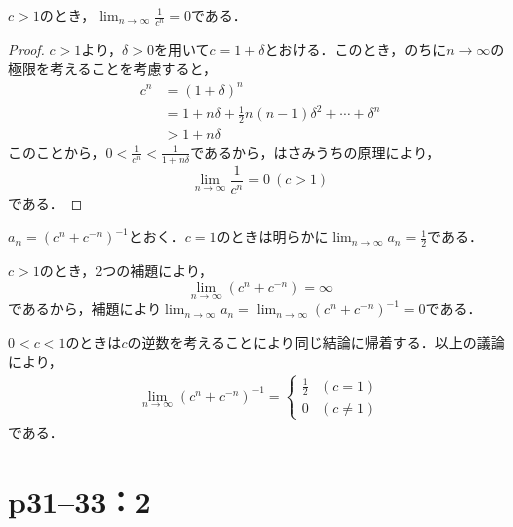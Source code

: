 \begin{lemma}{}{}



    $c>1$のとき，$\lim_{n \to \infty} \frac{1}{c^n} = 0$である．


\end{lemma}
\begin{proof}
    $c>1$より，$\delta >0$を用いて$c=1+\delta$とおける．このとき，のちに$n \to \infty$の極限を考えることを考慮すると，
    \begin{align*}
        c^n & = (1+\delta)^n                                               \\
            & = 1+n \delta +\frac{1}{2}n (n-1) \delta^2 + \cdots +\delta^n \\
            & > 1+n \delta
    \end{align*}
    このことから，$0<\frac{1}{c^n} <\frac{1}{1+n\delta}$であるから，はさみうちの原理により，
    \[
        \lim_{n \to \infty} \frac{1}{c^n} = 0~(c>1)
    \]
    である．
\end{proof}

\begin{tanswer}
    $a_n = (c^n +c^{-n})^{-1}$とおく．$c=1$のときは明らかに$\lim_{n \to \infty} a_n =\frac{1}{2}$である．

    $c>1$のとき，2つの補題により，
    \[
        \lim_{n \to \infty} (c^n + c^{-n}) = \infty
    \]
    であるから，補題により$\lim_{n \to \infty} a_n = \lim_{n \to \infty} (c^n +c^{-n})^{-1} =0$である．

    $0<c<1$のときは$c$の逆数を考えることにより同じ結論に帰着する．以上の議論により，
    \begin{align*}
        \lim_{n \to \infty} (c^n +c^{-n})^{-1} =
        \begin{cases}
            \frac{1}{2} & (c=1)     \\
            0           & (c \ne 1)
        \end{cases}
    \end{align*}
    である．
\end{tanswer}


\section*{p31--33：2}

